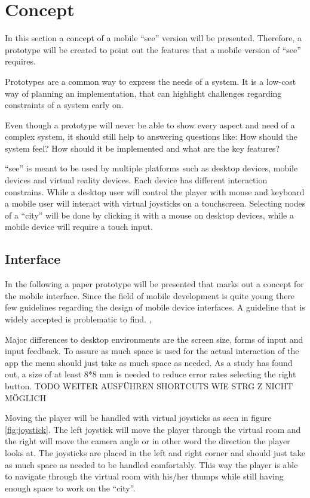 \section{Concept}
In this section a concept of a mobile \enquote{\gls{see}} version will be presented. 
Therefore, a prototype will be created to point out the features that a mobile version of \enquote{\gls{see}} requires.

Prototypes are a common way to express the needs of a system. 
It is a low-cost way of planning an implementation, that can highlight challenges regarding constraints of a system early on.

Even though a prototype will never be able to show every aspect and need of a complex system, it should still help to answering questions like: 
How should the system feel? How should it be implemented and what are the key features? \cite{houde1997prototypes} 

\enquote{\gls{see}} is meant to be used by multiple platforms such as desktop devices, mobile devices and virtual reality devices.
Each device has different interaction constrains. 
While a desktop user will control the player with mouse and keyboard a mobile user will interact with virtual joysticks on a touchscreen.
Selecting nodes of a \enquote{\gls{city}} will be done by clicking it with a mouse on desktop devices, while a mobile device will require a touch input.

\subsection{Interface}

In the following a paper prototype will be presented that marks out a concept for the mobile interface.
Since the field of mobile development is quite young there few guidelines regarding the design of mobile device interfaces.
A guideline that is widely accepted is problematic to find. \cite{renaud2017demarcating}, \cite{punchoojit2017usability}

Major differences to desktop environments are the screen size, forms of input and input feedback.
To assure as much space is used for the actual interaction of the app the menu should just take as much space as needed.
As a study has found out, a size of at least 8*8 mm is needed to reduce error rates selecting the right button. \cite{conradi2015optimal} \cite{parhi2006target}
TODO WEITER AUSFÜHREN
SHORTCUTS WIE STRG Z NICHT MÖGLICH
 \cite{adipat2005interface} 

Moving the player will be handled with virtual joysticks as seen in figure \ref{fig:joystick}.
The left joystick will move the player through the virtual room and the right will move the camera angle or in other word the direction the player looks at.
The joysticks are placed in the left and right corner and should just take as much space as needed to be handled comfortably.
This way the player is able to navigate through the virtual room with his/her thumps while still having enough space to work on the \enquote{\gls{city}}.

